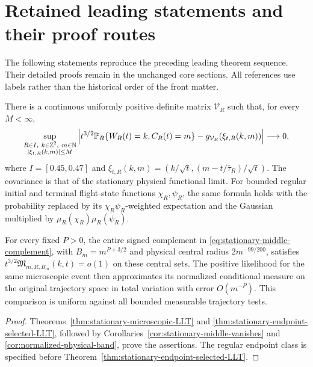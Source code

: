 \section{Retained leading statements and their proof routes}
\label{app:v49-retained-leading}
The following statements reproduce the preceding leading theorem sequence.
Their detailed proofs remain in the unchanged core sections. All references
use labels rather than the historical order of the front matter.

\begin{leadtheorem}
\label{thm:intro-stationary-microscopic}
There is a continuous uniformly positive definite matrix $\mathcal V_R$
such that, for every $M<\infty$,
\begin{equation}\label{eq:intro-stationary-local-law}
 \sup_{\substack{R\in I,\ k\in\Z^2,\ m\in\mathbb N\\
                     |\xi_{t,R}(k,m)|\le M}}
 \left|t^{3/2}\mathbb P_R\{W_R(t)=k,C_R(t)=m\}
              -g_{\mathcal V_R}(\xi_{t,R}(k,m))\right|\longrightarrow0,
\end{equation}
where $I=[0.45,0.47]$ and
$\xi_{t,R}(k,m)=(k/\sqrt t,(m-t/\bar\tau_R)/\sqrt t)$.
The covariance is that of the stationary physical functional limit.
For bounded regular initial and terminal flight-state functions
$\chi_R,\psi_R$, the same formula holds with the probability replaced
by its $\chi_R\psi_R$-weighted expectation and the Gaussian multiplied
by $\mu_R(\chi_R)\mu_R(\psi_R)$.

For every fixed $P>0$, the entire signed complement in
\eqref{eq:stationary-middle-complement}, with $B_m=m^{P+3/2}$ and
physical central radius $2m^{-99/200}$, satisfies
$t^{3/2}\mathfrak M_{m,R,B_m}(k,t)=o(1)$ on these central sets.
The positive likelihood for the same microscopic event then approximates
its normalized conditional measure on the original trajectory space
in total variation with error $O(m^{-P})$. This comparison is uniform
against all bounded measurable trajectory tests.
\end{leadtheorem}
\begin{proof}
Theorems~\ref{thm:stationary-microscopic-LLT} and
\ref{thm:stationary-endpoint-selected-LLT}, followed by
Corollaries~\ref{cor:stationary-middle-vanishes} and
\ref{cor:normalized-physical-band}, prove the assertions. The regular
endpoint class is specified before
Theorem~\ref{thm:stationary-endpoint-selected-LLT}.
\end{proof}

